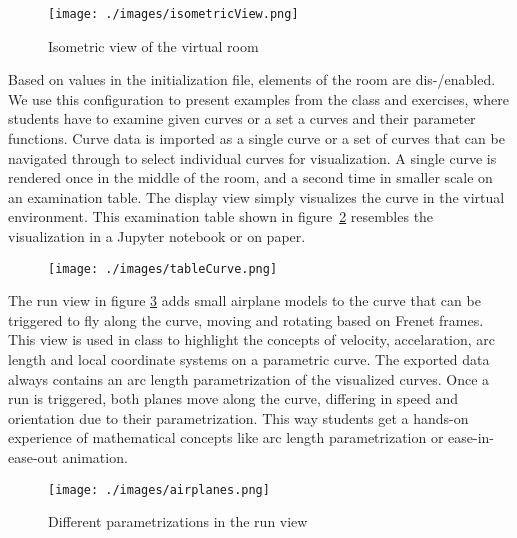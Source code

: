 \documentclass{VRARWorkshop}
\begin{document}
\begin{figure}[h!]
  \begin{center}
  \texttt{[image: ./images/isometricView.png]}
  \caption{\label{fig:isoView}
           Isometric view of the virtual room}
   \end{center}
\end{figure}

Based on values in the initialization file, elements of the room are dis-/enabled.
We use this configuration to present examples from the class and exercises, where students have to examine given curves or a set a curves and their parameter functions.
Curve data is imported as a single curve or a set of curves that can be navigated through to select individual curves for visualization.
A single curve is rendered once in the middle of the room, and a second time in smaller scale on an examination table.
The display view simply visualizes the curve in the virtual environment. This examination table shown in figure~\ref{fig:table} resembles the visualization in a Jupyter notebook or on paper.


\begin{figure}[h!]
    \begin{center}
        \texttt{[image: ./images/tableCurve.png]}
        \caption{\label{fig:table}}
    \end{center}
\end{figure}

The run view in figure \ref{fig:airplanes} adds small airplane models to the curve that can be triggered to fly along the curve, moving and rotating based on Frenet frames.
This view is used in class to highlight the concepts of velocity, accelaration, arc length and local coordinate systems on a parametric curve.
The exported data always contains an arc length parametrization of the visualized curves.
Once a run is triggered, both planes move along the curve, differing in speed and orientation due to their parametrization.
This way students get a hands-on experience of mathematical concepts like arc length parametrization or ease-in-ease-out animation.

\begin{figure}[h!]
  \begin{center}
  \texttt{[image: ./images/airplanes.png]}
  \caption{\label{fig:airplanes}
           Different parametrizations in the run view}
   \end{center}
\end{figure}
\end{document}
